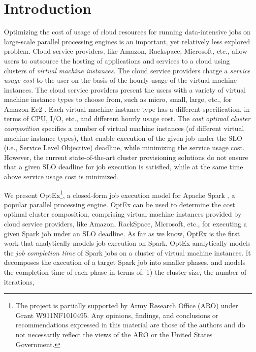 \documentclass[conference]{IEEEtran}
\begin{document}
\section{Introduction}
Optimizing the cost of usage of cloud resources for running data-intensive jobs on large-scale parallel
processing engines is an important, yet relatively less explored problem.
Cloud service providers, like Amazon, Rackspace, Microsoft, etc., allow users to outsource the hosting of applications and services to a cloud using clusters of \emph{virtual machine instances}. The cloud service providers charge a \emph{service usage cost} to the user on the basis of the hourly usage \cite{inc_amazon_2008} of the virtual machine instances.
   The cloud service providers present the users with a variety of
 virtual machine instance types to choose from, such as  micro, small, large, etc.,
 for Amazon Ec2  \cite{inc_amazon_2008}. Each virtual machine instance type has a different specification, in terms of CPU, I/O, etc.,  and different hourly usage cost. The \emph{cost optimal cluster composition} specifies a number of virtual machine instances (of different virtual
 machine instance types), that enable execution of the given job under the SLO (i.e., Service Level Objective) deadline, while  minimizing the service usage cost. However, the current state-of-the-art \cite{daniel2011prediction, Imai:2013:ARP:2588611.2588688, singer2010towards} cluster provisioning
 solutions do not ensure that a given SLO deadline for job execution is
 satisfied, while at the same time above service usage cost is minimized.
   \par We present OptEx\footnote{The project is partially supported by Army Research Office (ARO) under Grant W911\-NF1010495.  Any opinions, findings, and conclusions or recommendations expressed in this material are those of the authors and do not necessarily reflect
the views of the ARO or the United States Government.},
a closed-form job execution model for Apache Spark  \cite{Zaharia:2012:RDD:2228298.2228301}, a popular
 parallel processing engine. OptEx can be used to
determine  the  cost optimal cluster composition, comprising virtual machine instances provided by cloud service providers, like Amazon, RackSpace, Microsoft, etc., for executing a given Spark job under an SLO deadline.
  As far as we know, OptEx
is the first work that analytically models job execution on Spark.
  OptEx analytically models the \emph{job completion time} of Spark jobs on a cluster of virtual machine
 instances. It decomposes the
 execution of  a target Spark job into smaller phases, and models the completion time of each phase in terms of: 1) the cluster size, the number of iterations,
\end{document}
